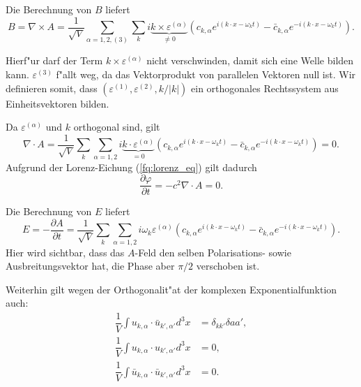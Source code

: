 \begin{refsection}
Die Berechnung von $B$ liefert
\begin{equation*}
B = \nabla \times A = \frac{1}{ \sqrt{V}} \sum_{\alpha=1,2,(3)}  \sum_k i \underbrace{k \times \varepsilon^{(\alpha)}}_{\neq 0} \left(c_{k,\alpha} e^{i (k \cdot x - \omega_k t)} - \bar{c}_{k,\alpha} e^{-i(k \cdot x - \omega_k t)} \right).
\end{equation*}

Hierf"ur darf der Term $k \times \varepsilon^{(\alpha)}$ nicht verschwinden, damit sich eine Welle bilden kann. $\varepsilon^{(3)}$ f"allt weg, da das Vektorprodukt von parallelen Vektoren null ist. Wir definieren somit, dass $(\varepsilon^{(1)}, \varepsilon^{(2)} , k/|k|)$ ein orthogonales Rechtssystem aus Einheitsvektoren bilden.

Da $\varepsilon^{(\alpha)}$ und $k$ orthogonal sind, gilt
\begin{equation*}
\nabla \cdot A = \frac{1}{\sqrt{V}} \sum_k \sum_{\alpha=1,2} i \underbrace{k \cdot \varepsilon^{(\alpha)}}_{=0} \left(c_{k,\alpha} e^{i (k \cdot x - \omega_k t)} - \bar{c}_{k,\alpha} e^{-i(k \cdot x - \omega_k t)}\right) = 0.
\end{equation*}
Aufgrund der Lorenz-Eichung (\ref{fq:lorenz_eq}) gilt dadurch
\begin{equation*}
\frac{\partial \varphi }{\partial t} = - c^2 \nabla \cdot A = 0.
\end{equation*}

Die Berechnung von $E$ liefert
\begin{equation*}
	E = - \frac{\partial A}{\partial t} = \frac{1}{\sqrt{V}} \sum_k \sum_{\alpha=1,2} i \omega_k \varepsilon^{(\alpha)} \left(c_{k,\alpha} e^{i (k \cdot x - \omega_k t)} - \bar{c}_{k,\alpha} e^{-i(k \cdot x - \omega_k t)} \right).
\end{equation*}
Hier wird sichtbar, dass das $A$-Feld den selben Polarisations- sowie Ausbreitungsvektor hat, die Phase aber $\pi/2$ verschoben ist.

Weiterhin gilt wegen der Orthogonalit"at der komplexen Exponentialfunktion auch:
\begin{align*}
\dfrac{1}{V} \int u_{k,\alpha} \cdot \bar{u}_{k',\alpha'} d^3 x &= \delta_{kk'}\delta{aa'}, \\
\dfrac{1}{V} \int u_{k,\alpha} \cdot u_{k',\alpha'} d^3 x &= 0, \\
\dfrac{1}{V} \int \bar{u}_{k,\alpha} \cdot \bar{u}_{k',\alpha'} d^3 x &= 0.
\end{align*}


\end{refsection}
